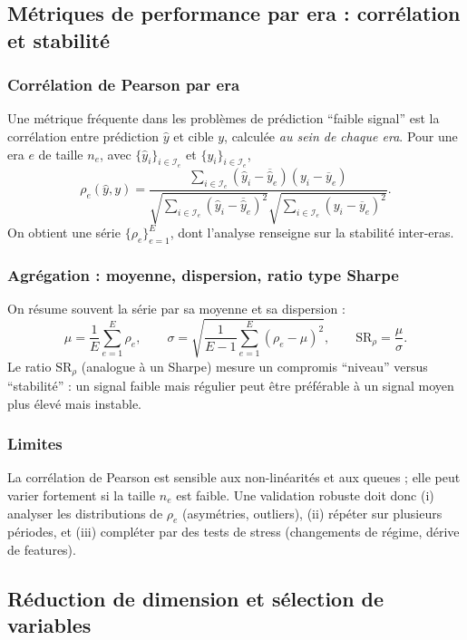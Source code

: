 \documentclass[11pt,a4paper]{article}
\newcommand{\1}{\mathbf{1}}
\begin{document}
\subsection{M\'etriques de performance par era : corr\'elation et stabilit\'e}

\subsubsection{Corr\'elation de Pearson par era}
Une m\'etrique fr\'equente dans les probl\`emes de pr\'ediction ``faible signal'' est la corr\'elation entre pr\'ediction $\widehat y$ et cible $y$,
calcul\'ee \emph{au sein de chaque era}. Pour une era $e$ de taille $n_e$, avec $\{\widehat y_i\}_{i\in\mathcal{I}_e}$ et $\{y_i\}_{i\in\mathcal{I}_e}$,
\[
\rho_e(\widehat y,y)=
\frac{\sum_{i\in\mathcal{I}_e}(\widehat y_i-\overline{\widehat y}_e)(y_i-\overline y_e)}
{\sqrt{\sum_{i\in\mathcal{I}_e}(\widehat y_i-\overline{\widehat y}_e)^2}\sqrt{\sum_{i\in\mathcal{I}_e}(y_i-\overline y_e)^2}}.
\]
On obtient une s\'erie $\{\rho_e\}_{e=1}^E$, dont l'analyse renseigne sur la stabilit\'e inter-eras.

\subsubsection{Agr\'egation : moyenne, dispersion, ratio type Sharpe}
On r\'esume souvent la s\'erie par sa moyenne et sa dispersion :
\[
\mu = \frac{1}{E}\sum_{e=1}^E\rho_e,
\qquad
\sigma = \sqrt{\frac{1}{E-1}\sum_{e=1}^E(\rho_e-\mu)^2},
\qquad
\mathrm{SR}_{\rho}=\frac{\mu}{\sigma}.
\]
Le ratio $\mathrm{SR}_{\rho}$ (analogue \`a un Sharpe) mesure un compromis ``niveau'' versus ``stabilit\'e'' : un signal faible mais r\'egulier peut \^etre
pr\'ef\'erable \`a un signal moyen plus \'elev\'e mais instable.

\subsubsection{Limites}
La corr\'elation de Pearson est sensible aux non-lin\'earit\'es et aux queues ; elle peut varier fortement si la taille $n_e$ est faible.
Une validation robuste doit donc (i) analyser les distributions de $\rho_e$ (asym\'etries, outliers), (ii) r\'ep\'eter sur plusieurs p\'eriodes,
et (iii) compl\'eter par des tests de stress (changements de r\'egime, d\'erive de features).

\subsection{R\'eduction de dimension et s\'election de variables}
\end{document}
